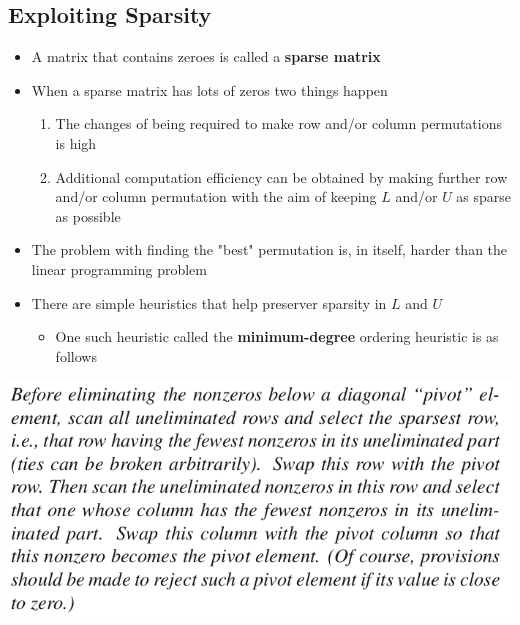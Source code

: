 \documentclass[11pt]{article}
\begin{document}
\subsection{Exploiting Sparsity}
\label{sec:orgeded59c}
\begin{itemize}
\item A matrix that contains zeroes is called a \textbf{sparse matrix}
\item When a sparse matrix has lots of zeros two things happen
\begin{enumerate}
\item The changes of being required to make row and/or column permutations is high
\item Additional computation efficiency can be obtained by making further row and/or column permutation with the aim of keeping \(L\) and/or \(U\) as sparse as possible
\end{enumerate}

\item The problem with finding the "best" permutation is, in itself, harder than the linear programming problem
\item There are simple heuristics that help preserver sparsity in \(L\) and \(U\)
\begin{itemize}
\item One such heuristic called the \textbf{minimum-degree} ordering heuristic is as follows
\end{itemize}
\end{itemize}
\begin{center}
\includegraphics[width=.9\linewidth]{Implementation Issues/screenshot_2019-02-11_19-06-52.png}
\end{center}
\end{document}
